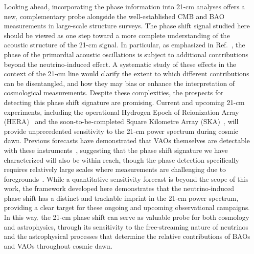 \documentclass[floats,floatfix,showpacs,amssymb,prd,twocolumn,superscriptaddress,nofootinbib,reprint,preprintnumbers]{revtex4-2}
\begin{document}
Looking ahead, incorporating the phase information into 21-cm analyses offers a new, complementary probe alongside the well-established CMB and BAO measurements in large-scale structure surveys. The phase shift signal studied here should be viewed as one step toward a more complete understanding of the acoustic structure of the  21-cm signal. In particular, as emphasized in Ref.~\cite{Green:2020fjb}, the phase of the primordial acoustic oscillations is subject to additional contributions beyond the neutrino-induced effect. A systematic study of these effects in the context of the 21-cm line would clarify the extent to which different contributions can be disentangled, and how they may bias or enhance the interpretation of cosmological measurements. Despite these complexities, the prospects for detecting this phase shift signature are promising. Current and upcoming 21-cm experiments, including the operational Hydrogen Epoch of Reionization Array (HERA)~\citep{deboer17,hera23} and the soon-to-be-completed Square Kilometre Array (SKA)~\citep{SKA:2018ckk, SKA19}, will provide unprecedented sensitivity to the 21-cm power spectrum during cosmic dawn. Previous forecasts have demonstrated that VAOs themselves are detectable with these instruments~\cite{munoz19b, Sarkar:2022mdz}, suggesting that the phase shift signature we have characterized will also be within reach, though the phase detection specifically requires relatively large scales where measurements are challenging due to foregrounds~\cite{liu20}. 
While a quantitative sensitivity forecast is beyond the scope of this work, the framework developed here demonstrates that the neutrino-induced phase shift has a distinct and trackable imprint in the 21-cm power spectrum, providing a clear target for these ongoing and upcoming observational campaigns. In this way, the 21-cm phase shift can serve as valuable probe for both cosmology and astrophysics, through its sensitivity to the free-streaming nature of neutrinos and the astrophysical processes that determine the relative contributions of BAOs and VAOs throughout cosmic dawn.
\end{document}
